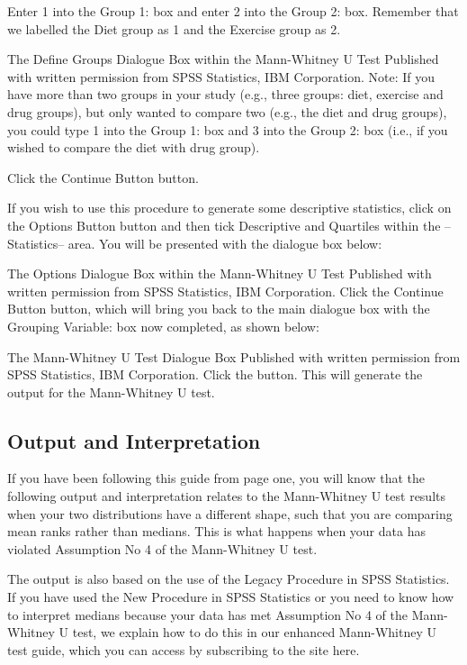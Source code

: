 \documentclass[]{article}
\begin{document}
Enter 1 into the Group 1: box and enter 2 into the Group 2: box. Remember that we labelled the Diet group as 1 and the Exercise group as 2.

The Define Groups Dialogue Box within the Mann-Whitney U Test
Published with written permission from SPSS Statistics, IBM Corporation.
Note: If you have more than two groups in your study (e.g., three groups: diet, exercise and drug groups), but only wanted to compare two (e.g., the diet and drug groups), you could type 1 into the Group 1: box and 3 into the Group 2: box (i.e., if you wished to compare the diet with drug group).

Click the Continue Button button.

If you wish to use this procedure to generate some descriptive statistics, click on the Options Button button and then tick Descriptive and Quartiles within the –Statistics– area. You will be presented with the dialogue box below:

The Options Dialogue Box within the Mann-Whitney U Test
Published with written permission from SPSS Statistics, IBM Corporation.
Click the Continue Button button, which will bring you back to the main dialogue box with the Grouping Variable: box now completed, as shown below:

The Mann-Whitney U Test Dialogue Box
Published with written permission from SPSS Statistics, IBM Corporation.
Click the  button. This will generate the output for the Mann-Whitney U test.

\subsection{Output and Interpretation}
If you have been following this guide from page one, you will know that the following output and interpretation relates to the Mann-Whitney U test results when your two distributions have a different shape, such that you are comparing mean ranks rather than medians. This is what happens when your data has violated Assumption No 4 of the Mann-Whitney U test. 

The output is also based on the use of the Legacy Procedure in SPSS Statistics. If you have used the New Procedure in SPSS Statistics or you need to know how to interpret medians because your data has met Assumption No 4 of the Mann-Whitney U test, we explain how to do this in our enhanced Mann-Whitney U test guide, which you can access by subscribing to the site here.
\end{document}
